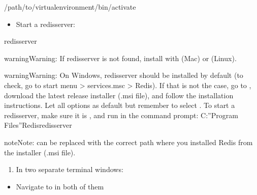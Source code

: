 \documentclass[letterpaper,10pt,english]{sphinxmanual}
\begin{document}
\begin{sphinxVerbatim}[commandchars=\\\{\}]
\PYGZdl{}  /path/to/virtualenvironment/bin/activate
\end{sphinxVerbatim}
\begin{itemize}
\item {} 
Start a redis\sphinxhyphen{}server:

\end{itemize}

\begin{sphinxVerbatim}[commandchars=\\\{\}]
\PYGZdl{} redis\PYGZhy{}server
\end{sphinxVerbatim}

\begin{sphinxadmonition}{warning}{Warning:}
If redis\sphinxhyphen{}server is not found, install with  (Mac) or  (Linux).
\end{sphinxadmonition}

\begin{sphinxadmonition}{warning}{Warning:}
On Windows, redis\sphinxhyphen{}server should be installed by default (to check, go to start menu \textgreater{} services.msc \textgreater{} Redis). If that is not the case, go to , download the latest release installer (.msi file), and follow the installation instructions. Let all options as default but remember to select . To start a redis\sphinxhyphen{}server, make sure it is , and run in the command prompt: C:”Program Files”Redisredis\sphinxhyphen{}server
\end{sphinxadmonition}

\begin{sphinxadmonition}{note}{Note:}
 can be replaced with the correct path where you installed Redis from the installer (.msi file).
\end{sphinxadmonition}
\begin{enumerate}
%
\setcounter{enumi}{1}
\item {} 
In two separate terminal windows:

\end{enumerate}
\begin{itemize}
\item {} 
Navigate to  in both of them

\end{itemize}
\end{document}
